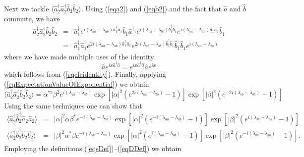\documentclass[12pt]{iopart}
\begin{document}
Next we tackle $\langle \hat{a}^{\dagger}_2 \hat{a}^{\dagger}_2 \hat{b}_2 \hat{b}_2 \rangle$. Using (\ref{eqa2}) and (\ref{eqb2}) and the fact that $\hat{a}$ and $\hat{b}$ commute, we have
\begin{eqnarray}
\hat{a}^{\dagger}_2 \hat{a}^{\dagger}_2 \hat{b}_2 \hat{b}_2 &=& \hat{a}^{\dagger}_1 
  e^{i (\lambda_{aa}-\lambda_{ab}) \hat{a}^{\dagger}_1 \hat{a}_1}
  \hat{b}_1 \hat{a}^{\dagger_1}
  e^{i (\lambda_{ab}-\lambda_{bb}) \hat{b}^{\dagger}_1 \hat{b}_1}
  e^{i (\lambda_{aa}-\lambda_{ab}) \hat{a}^{\dagger}_1 \hat{a}_1}
  \hat{b}_1 \\
%
&=& \hat{a}^{\dagger}_1 \hat{a}^{\dagger}_1 
    e^{2i (\lambda_{aa}-\lambda_{ab}) \hat{a}^{\dagger}_1 \hat{a}_1}
    e^{2i (\lambda_{ab}-\lambda_{bb}) \hat{b}^{\dagger}_1 \hat{b}_1}
    \hat{b}_1 \hat{b}_1 e^{i(\lambda_{aa}-\lambda_{bb})}
\end{eqnarray}
where we have made multiple uses of the identity 
\begin{equation}
\hat{a} e^{i x \hat{a}^{\dagger} \hat{a}} = e^{i x \hat{a}^{\dagger} \hat{a}} \hat{a} e^{ix}
\end{equation}
which follows from (\ref{eqefeidentity}). Finally, applying (\ref{eqExpectationValueOfExponential}) we obtain
\begin{equation}
\langle \hat{a}^{\dagger}_2 \hat{a}^{\dagger}_2 \hat{b}_2 \hat{b}_2 \rangle = \alpha^{*2} \beta^2 e^{i(\lambda_{aa}-\lambda_{bb})} \exp[|\alpha|^2(e^{2i (\lambda_{aa} - \lambda_{bb})} -1)] \exp[|\beta|^2(e^{-2i (\lambda_{bb} - \lambda_{bb})} -1)] 
\end{equation}
Using the same techniques one can show that
\begin{eqnarray}
\langle \hat{a}^{\dagger}_2 \hat{b}^{\dagger}_2 \hat{a}_2 \hat{a}_2 \rangle &=& |\alpha|^2 \alpha \beta^* e^{-i(\lambda_{aa}-\lambda_{ab})} \exp[|\alpha|^2(e^{-i (\lambda_{aa} - \lambda_{ab})} -1)] \exp[|\beta|^2(e^{i (\lambda_{bb} - \lambda_{ab})} -1)] \\
%
\langle \hat{a}^{\dagger}_2 \hat{b}^{\dagger}_2 \hat{b}_2 \hat{b}_2 \rangle &=& |\beta|^2 \alpha^{*} \beta e^{-i(\lambda_{bb}-\lambda_{ab})} \exp[|\alpha|^2(e^{i (\lambda_{aa} - \lambda_{ab})} -1)] \exp[|\beta|^2(e^{-i (\lambda_{bb} - \lambda_{ab})} -1)].
\end{eqnarray}
Employing the definitions (\ref{eqsDef})--(\ref{eqDDef}) we obtain
\end{document}
